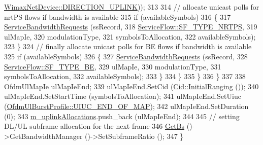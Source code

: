 \begin{DoxyCode}
      \hyperlink{classns3_1_1WimaxNetDevice_a194b6cf7eb59582328eb2531dc9ed884ad37a477621d1df190ff8d8fb933349cd}{WimaxNetDevice::DIRECTION\_UPLINK}));
313 
314               \textcolor{comment}{// allocate unicast polls for nrtPS flows if bandwidth is available}
315               \textcolor{keywordflow}{if} (availableSymbols)
316                 \{
317                   \hyperlink{classns3_1_1UplinkSchedulerRtps_a35d16645e1db685e5df2b5fc7527f5de}{ServiceBandwidthRequests} (ssRecord,
318                                             \hyperlink{classns3_1_1ServiceFlow_a7990ba10be1e098328fd1e6382a26235a7f8577f851a9f01d159442a3a3fcdf48}{ServiceFlow::SF\_TYPE\_NRTPS},
319                                             ulMapIe,
320                                             modulationType,
321                                             symbolsToAllocation,
322                                             availableSymbols);
323                 \}
324               \textcolor{comment}{// finally allocate unicast polls for BE flows if bandwidth is available}
325               \textcolor{keywordflow}{if} (availableSymbols)
326                 \{
327                   \hyperlink{classns3_1_1UplinkSchedulerRtps_a35d16645e1db685e5df2b5fc7527f5de}{ServiceBandwidthRequests} (ssRecord,
328                                             \hyperlink{classns3_1_1ServiceFlow_a7990ba10be1e098328fd1e6382a26235af93a8bd8fce654e688f957f6f362e5c7}{ServiceFlow::SF\_TYPE\_BE},
329                                             ulMapIe,
330                                             modulationType,
331                                             symbolsToAllocation,
332                                             availableSymbols);
333                 \}
334             \}
335         \}
336     \}
337 
338   OfdmUlMapIe ulMapIeEnd;
339   ulMapIeEnd.SetCid (\hyperlink{classns3_1_1Cid_a5c204ab0df783c7594c764bae1611436}{Cid::InitialRanging} ());
340   ulMapIeEnd.SetStartTime (symbolsToAllocation);
341   ulMapIeEnd.SetUiuc (\hyperlink{classns3_1_1OfdmUlBurstProfile_ae528783c4b3c6700ff49dfd7a555cb3dabef491e8d426af16beba1541b947b7e9}{OfdmUlBurstProfile::UIUC\_END\_OF\_MAP});
342   ulMapIeEnd.SetDuration (0);
343   \hyperlink{classns3_1_1UplinkSchedulerRtps_a4cb3da7f31082b64a21b7f9adc7fd2e4}{m\_uplinkAllocations}.push\_back (ulMapIeEnd);
344 
345   \textcolor{comment}{// setting DL/UL subframe allocation for the next frame}
346   \hyperlink{classns3_1_1UplinkScheduler_afe61b7de71d92d2dff1b135744a6ff7e}{GetBs} ()->GetBandwidthManager ()->SetSubframeRatio ();
347 \}
\end{DoxyCode}


